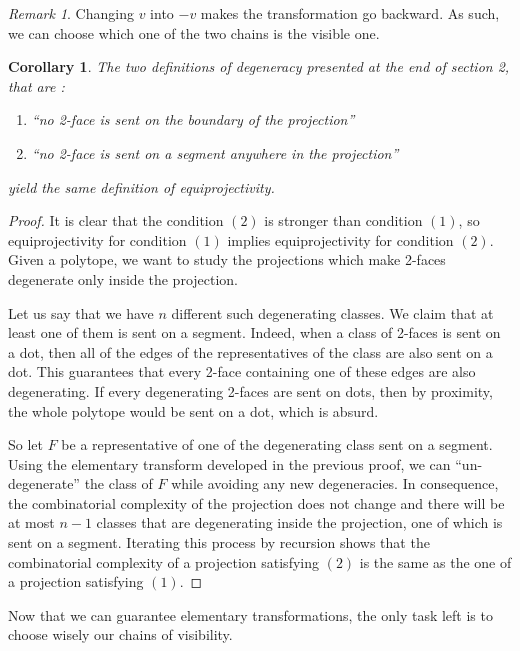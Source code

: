 \documentclass[12pt, notitlepage]{article}
\theoremstyle{plain}
\theoremstyle{definition}
\theoremstyle{plain}
\theoremstyle{remark}
\newtheorem*{rmk}{Remark}
\theoremstyle{plain}
\theoremstyle{plain}
\newtheorem{corollary}[thm]{Corollary}
\begin{document}
\begin{rmk}
    Changing $v$ into $-v$ makes the transformation go backward. As such, we can choose which one of the two chains is the visible one.
\end{rmk}

\begin{corollary}
    The two definitions of degeneracy presented at the end of section 2, that are :
    \begin{enumerate}
        \item “no 2-face is sent on the boundary of the projection”
        \item “no 2-face is sent on a segment anywhere in the projection”
    \end{enumerate}
    yield the same definition of equiprojectivity.
\end{corollary}

\begin{proof}
    It is clear that the condition $(2)$ is stronger than condition $(1)$, so equiprojectivity for condition $(1)$ implies equiprojectivity for condition $(2)$. Given a polytope, we want to study the projections which make 2-faces degenerate only inside the projection.
    
    Let us say that we have $n$ different such degenerating classes. We claim that at least one of them is sent on a segment. Indeed, when a class of 2-faces is sent on a dot, then all of the edges of the representatives of the class are also sent on a dot. This guarantees that every 2-face containing one of these edges are also degenerating. If every degenerating 2-faces are sent on dots, then by proximity, the whole polytope would be sent on a dot, which is absurd.
    
    So let $F$ be a representative of one of the degenerating class sent on a segment. Using the elementary transform developed in the previous proof, we can “un-degenerate” the class of $F$ while avoiding any new degeneracies. In consequence, the combinatorial complexity of the projection does not change and there will be at most $n-1$ classes that are degenerating inside the projection, one of which is sent on a segment. Iterating this process by recursion shows that the combinatorial complexity of a projection satisfying $(2)$ is the same as the one of a projection satisfying $(1)$.
\end{proof}

Now that we can guarantee elementary transformations, the only task left is to choose wisely our chains of visibility.
\end{document}
